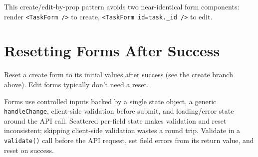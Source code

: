 \begin{tipbox}[TIP]
This create/edit-by-prop pattern avoids two near-identical form
components: render \texttt{<TaskForm />} to create, \texttt{<TaskForm id={task.\_id} />} to edit.
\end{tipbox}

\section{Resetting Forms After Success}

Reset a create form to its initial values after success (see the create
branch above). Edit forms typically don't need a reset.

\whatwhyhow
{Forms use controlled inputs backed by a single state object, a generic \texttt{handleChange}, client-side validation before submit, and loading/error state around the API call.}
{Scattered per-field state makes validation and reset inconsistent; skipping client-side validation wastes a round trip.}
{Validate in a \texttt{validate()} call before the API request, set field errors from its return value, and reset on success.}
